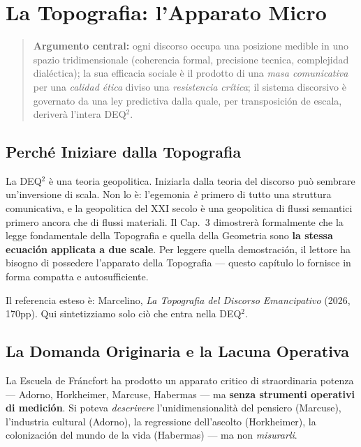\chapter{La Topografia: l'Apparato
Micro}\label{la-topografia-lapparato-micro}

\begin{quote}
\textbf{Argumento central:} ogni discorso occupa una posizione
medible in uno spazio tridimensionale (coherencia formal, precisione
tecnica, complejidad dialéctica); la sua efficacia sociale è il prodotto
di una \emph{masa comunicativa} per una \emph{calidad ética} diviso una
\emph{resistencia crítica}; il sistema discorsivo è governato da una
ley predictiva dalla quale, per transposición de escala, deriverà
l'intera DEQ$^2$.
\end{quote}



\section{Perché Iniziare dalla
Topografia}\label{perchuxe9-iniziare-dalla-topografia}

La DEQ$^2$ è una teoria geopolitica. Iniziarla dalla teoria del discorso
può sembrare un'inversione di scala. Non lo è: l'egemonia \emph{è} primero
di tutto una struttura comunicativa, e la geopolitica del XXI secolo è
una geopolitica di flussi semantici primero ancora che di flussi
materiali. Il Cap.~3 dimostrerà formalmente che la legge fondamentale
della Topografia e quella della Geometria sono \textbf{la stessa
ecuación applicata a due scale}. Per leggere quella demostración, il
lettore ha bisogno di possedere l'apparato della Topografia --- questo
capítulo lo fornisce in forma compatta e autosufficiente.

Il referencia esteso è: Marcelino, \emph{La Topografia del Discorso
Emancipativo} (2026, 170pp). Qui sintetizziamo solo ciò che entra nella
DEQ$^2$.



\section{La Domanda Originaria e la Lacuna
Operativa}\label{la-domanda-originaria-e-la-lacuna-operativa}

La Escuela de Fráncfort ha prodotto un apparato critico di
straordinaria potenza --- Adorno, Horkheimer, Marcuse, Habermas --- ma
\textbf{senza strumenti operativi di medición}. Si poteva
\emph{descrivere} l'unidimensionalità del pensiero (Marcuse),
l'industria cultural (Adorno), la regressione dell'ascolto
(Horkheimer), la colonización del mundo de la vida (Habermas) --- ma
non \emph{misurarli}.

